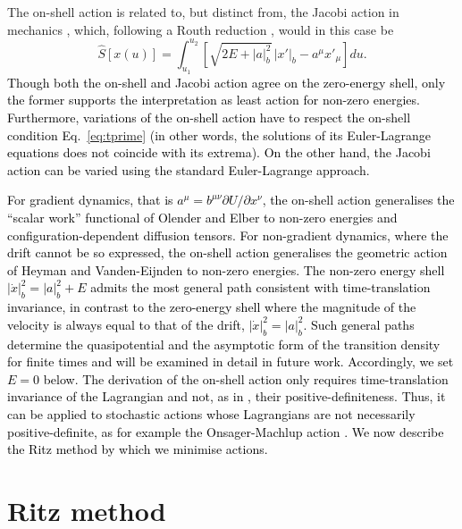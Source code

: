 The on-shell action is related to, but distinct from, the Jacobi action
in mechanics \citep{landau1959classical,gantmachner}, which, following
a Routh reduction \citep{whittaker1988}, would in this case be
\[
\hat{S}[x(u)]=\int_{u_{1}}^{u_{2}}\left[\sqrt{2E+|a|_{b}^{2}}\,|x'|_{b}-a^{\mu}x'_{\mu}\right]du.
\]
\textcolor{black}{Though both the on-shell and Jacobi action agree
on the zero-energy shell, only the former supports the interpretation
as least action for non-zero energies. Furthermore, variations of
the on-shell action have to respect the on-shell condition Eq.~\ref{eq:tprime}
(in other words, the solutions of its Euler-Lagrange equations does
not coincide with its extrema). On the other hand, the Jacobi action
can be varied using the standard Euler-Lagrange approach.}

\textcolor{black}{For gradient dynamics, that is $a^{\mu}=b^{\mu\nu}\partial U/\partial x^{\nu}$,
the on-shell action generalises the ``scalar work'' functional of
Olender and Elber \citep{olender1997yet} to non-zero energies and
configuration-dependent diffusion tensors. For non-gradient dynamics,
where the drift cannot be so expressed, the on-shell action generalises
the geometric action of Heyman and Vanden-Eijnden \citep{heymann2008geometric}
to non-zero energies. The non-zero energy shell $|\dot{x}|_{b}^{2}=|a|_{b}^{2}+E$
admits the most general path consistent with time-translation invariance,
in contrast to the zero-energy shell where the magnitude of the velocity
is always equal to that of the drift, $|\dot{x}|_{b}^{2}=|a|_{b}^{2}$.
Such general paths determine the quasipotential and the asymptotic
form of the transition density for finite times and will be examined
in detail in future work. Accordingly, we set $E=0$ below. The derivation
of the on-shell action only requires time-translation invariance of
the Lagrangian and not, as in \citep{olender1997yet,heymann2008geometric},
their positive-definiteness. Thus, it can be applied to stochastic
actions whose Lagrangians are not necessarily positive-definite, as
for example the Onsager-Machlup action \citep{onsager1953fluctuations,stratonovich1989some}.
We now describe the Ritz method by which we minimise actions. }

\section{Ritz method} \label{sec:direct-method}

